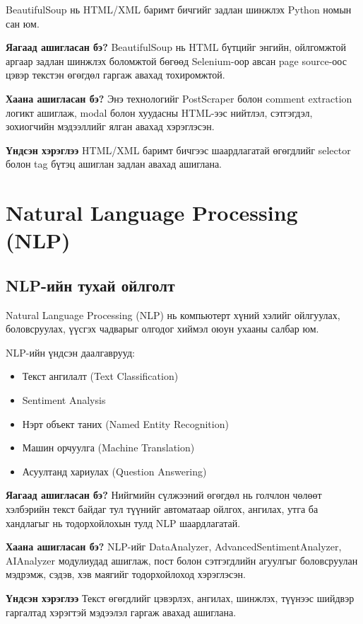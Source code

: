 \documentclass[12pt,a4paper]{report}
\begin{document}
BeautifulSoup нь HTML/XML баримт бичгийг задлан шинжлэх Python номын сан юм.


\textbf{Яагаад ашигласан бэ?} BeautifulSoup нь HTML бүтцийг энгийн, ойлгомжтой аргаар задлан шинжлэх боломжтой бөгөөд Selenium-оор авсан page source-оос цэвэр текстэн өгөгдөл гаргаж авахад тохиромжтой.

\textbf{Хаана ашигласан бэ?} Энэ технологийг PostScraper болон comment extraction логикт ашиглаж, modal болон хуудасны HTML-ээс нийтлэл, сэтгэгдэл, зохиогчийн мэдээллийг ялган авахад хэрэглэсэн.

\textbf{Үндсэн хэрэглээ} HTML/XML баримт бичгээс шаардлагатай өгөгдлийг selector болон tag бүтэц ашиглан задлан авахад ашиглана.

\section{Natural Language Processing (NLP)}

\subsection{NLP-ийн тухай ойлголт}

Natural Language Processing (NLP) нь компьютерт хүний хэлийг ойлгуулах, боловсруулах, үүсгэх чадварыг олгодог хиймэл оюун ухааны салбар юм.

NLP-ийн үндсэн даалгаврууд:
\begin{itemize}
    \item Текст ангилалт (Text Classification)
    \item Sentiment Analysis
    \item Нэрт объект таних (Named Entity Recognition)
    \item Машин орчуулга (Machine Translation)
    \item Асуултанд хариулах (Question Answering)
\end{itemize}

\textbf{Яагаад ашигласан бэ?} Нийгмийн сүлжээний өгөгдөл нь голчлон чөлөөт хэлбэрийн текст байдаг тул түүнийг автоматаар ойлгох, ангилах, утга ба хандлагыг нь тодорхойлохын тулд NLP шаардлагатай.

\textbf{Хаана ашигласан бэ?} NLP-ийг DataAnalyzer, AdvancedSentimentAnalyzer, AIAnalyzer модулиудад ашиглаж, пост болон сэтгэгдлийн агуулгыг боловсруулан мэдрэмж, сэдэв, хэв маягийг тодорхойлоход хэрэглэсэн.

\textbf{Үндсэн хэрэглээ} Текст өгөгдлийг цэвэрлэх, ангилах, шинжлэх, түүнээс шийдвэр гаргалтад хэрэгтэй мэдээлэл гаргаж авахад ашиглана.
\end{document}
